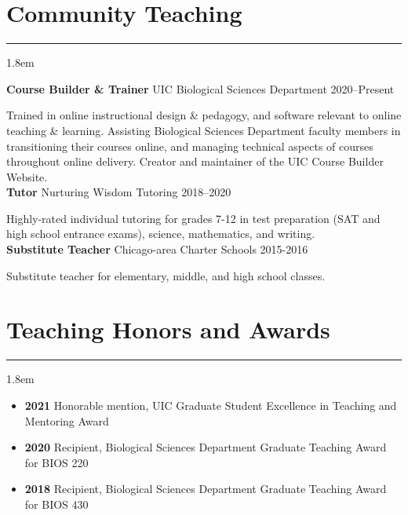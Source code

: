\documentclass[]{article}
\begin{document}
\clearpage
\pagestyle{alldocument}

\section{Community Teaching}
\hrule
\vspace{4mm}
\leftskip 1.8em

\textbf{Course Builder \& Trainer} UIC Biological Sciences Department \hfill 2020--Present
     
Trained in online instructional design \& pedagogy, and software relevant to online teaching \& \linebreak learning. Assisting Biological Sciences Department faculty members in transitioning their courses online, and managing technical aspects of courses throughout online delivery. Creator and maintainer of the UIC Course Builder Website. \href{https://www.ledelaney.org/cb-materials}{\faLink} \href{https://github.com/ledelaney/cb-materials}{\faGithub}\\
     
\textbf{Tutor} Nurturing Wisdom Tutoring \hfill 2018--2020
     
Highly-rated individual tutoring for grades 7-12 in test preparation (SAT and high school entrance \linebreak exams), science, mathematics, and writing.\\

\textbf{Substitute Teacher} Chicago-area Charter Schools \hfill 2015-2016
     
Substitute teacher for elementary, middle, and high school classes.

\section{Teaching Honors and Awards}
\hrule
\vspace{4mm}
\leftskip 1.8em

\begin{itemize}[label=$\mathwitch*$]
\item{\textbf{2021} Honorable mention, UIC Graduate Student Excellence in Teaching and Mentoring Award}
\item{\textbf{2020} Recipient, Biological Sciences Department Graduate Teaching Award for BIOS 220}
\item{\textbf{2018} Recipient, Biological Sciences Department Graduate Teaching Award for BIOS 430}
\end{itemize}
\end{document}
